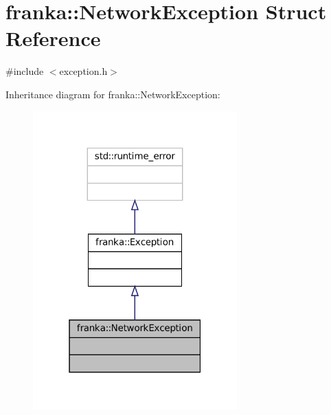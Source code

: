 \hypertarget{structfranka_1_1NetworkException}{}\section{franka\+:\+:Network\+Exception Struct Reference}
\label{structfranka_1_1NetworkException}


{\ttfamily \#include $<$exception.\+h$>$}



Inheritance diagram for franka\+:\+:Network\+Exception\+:
\nopagebreak
\begin{figure}[H]
\begin{center}
\leavevmode
\includegraphics[width=223pt]{structfranka_1_1NetworkException__inherit__graph}
\end{center}
\end{figure}


